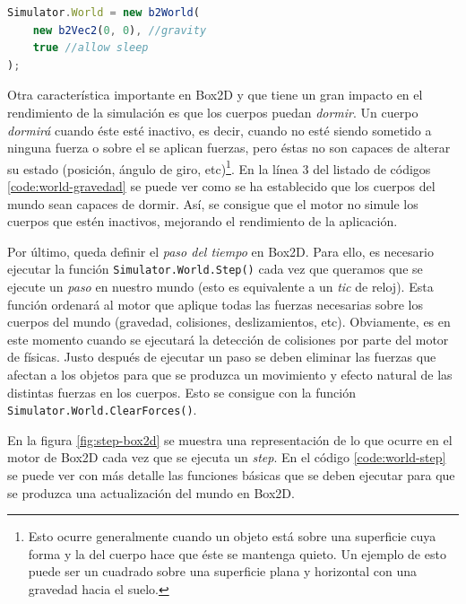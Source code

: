 \begin{lstlisting}[language={Javascript},label={code:world-gravedad}, caption={Definición del objeto \texttt{World} en Box2D con gravedad 0 y permitiendo que los cuerpos sean capaces de dormir.}]
Simulator.World = new b2World(
	new b2Vec2(0, 0), //gravity
	true //allow sleep
);
\end{lstlisting}

Otra característica importante en Box2D y que tiene un gran impacto en el rendimiento de la simulación es que los cuerpos puedan \emph{dormir}. Un cuerpo \emph{dormirá} cuando éste esté inactivo, es decir, cuando no esté siendo sometido a ninguna fuerza o sobre el se aplican fuerzas, pero éstas no son capaces de alterar su estado (posición, ángulo de giro, etc)\footnote{Esto ocurre generalmente cuando un objeto está sobre una superficie cuya forma y la del cuerpo hace que éste se mantenga quieto. Un ejemplo de esto puede ser un cuadrado sobre una superficie plana y horizontal con una gravedad hacia el suelo.}. En la línea 3 del listado de códigos \ref{code:world-gravedad} se puede ver como se ha establecido que los cuerpos del mundo sean capaces de dormir. Así, se consigue que el motor no simule los cuerpos que estén inactivos, mejorando el rendimiento de la aplicación.

Por último, queda definir el \emph{paso del tiempo} en Box2D. Para ello, es necesario ejecutar la función \texttt{Simulator.World.Step()} cada vez que queramos que se ejecute un \emph{paso} en nuestro mundo (esto es equivalente a un \emph{tic} de reloj). Esta función ordenará al motor que aplique todas las fuerzas necesarias sobre los cuerpos del mundo (gravedad, colisiones, deslizamientos, etc). Obviamente, es en este momento cuando se ejecutará la detección de colisiones por parte del motor de físicas. Justo después de ejecutar un paso se deben eliminar las fuerzas que afectan a los objetos para que se produzca un movimiento y efecto natural de las distintas fuerzas en los cuerpos. Esto se consigue con la función \texttt{Simulator.World.ClearForces()}.

En la figura \ref{fig:step-box2d} se muestra una representación de lo que ocurre en el motor de Box2D cada vez que se ejecuta un \emph{step}. En el código  \ref{code:world-step} se puede ver con más detalle las funciones básicas que se deben ejecutar para que se produzca una actualización del mundo en Box2D.

